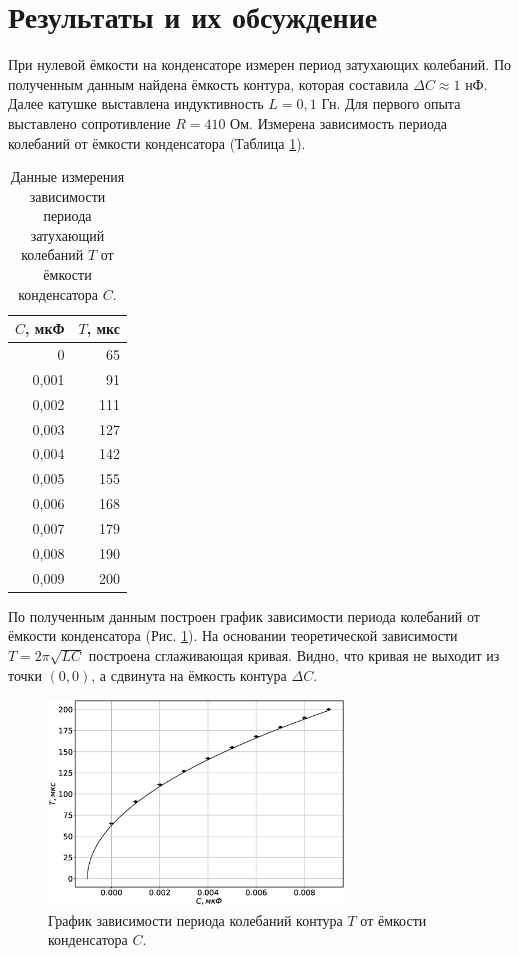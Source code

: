 \documentclass[12pt]{article}
\begin{document}
\section*{Результаты и их обсуждение}
При нулевой ёмкости на конденсаторе измерен период затухающих колебаний.
По полученным данным найдена ёмкость контура, которая составила $\Delta C \approx 1 \text{ нФ}$.
Далее катушке выставлена индуктивность $L = 0,1 \text{ Гн}$.
Для первого опыта выставлено сопротивление $R = 410 \text{ Ом}$. Измерена зависимость периода колебаний от ёмкости конденсатора (Таблица \ref{tab:1}).
\begin{table}[H]
	\centering
	\begin{tabular}{|r|r|}
		\hline
		$C$, мкФ & $T$, мкс \\ \hline
		0        & 65       \\ \hline
		0,001    & 91       \\ \hline
		0,002    & 111      \\ \hline
		0,003    & 127      \\ \hline
		0,004    & 142      \\ \hline
		0,005    & 155      \\ \hline
		0,006    & 168      \\ \hline
		0,007    & 179      \\ \hline
		0,008    & 190      \\ \hline
		0,009    & 200      \\ \hline
	\end{tabular}
	\caption{Данные измерения зависимости периода затухающий колебаний $T$ от ёмкости конденсатора $C$.}
	\label{tab:1}
\end{table}
По полученным данным построен график зависимости периода колебаний от ёмкости конденсатора (Рис. \ref{fig:CT}). На основании теоретической
зависимости $T = 2 \pi \sqrt{LC} $ построена сглаживающая кривая. Видно, что кривая не выходит из точки $(0, 0)$, а сдвинута на ёмкость контура $\Delta C$.

\begin{figure}[H]
	\centering
	\includegraphics[width=0.7\textwidth]{CT.eps}
	\caption{График зависимости периода колебаний контура $T$ от ёмкости конденсатора $C$.}
	\label{fig:CT}
\end{figure}
\end{document}
